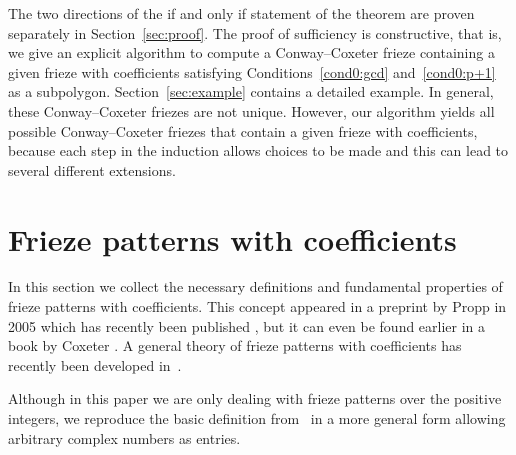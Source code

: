 \documentclass[10pt]{amsart}
\numberwithin{equation}{section}
\theoremstyle{definition}
\theoremstyle{remark}
\begin{document}
The two directions of the if and only if statement of the
theorem are proven separately in Section~\ref{sec:proof}. The proof of
sufficiency is constructive, that is, we give an explicit algorithm to
compute a Conway--Coxeter frieze containing a given frieze with coefficients
satisfying Conditions~\eqref{cond0:gcd} and~\eqref{cond0:p+1} as a subpolygon. 
Section~\ref{sec:example} contains a detailed example. 
In general, these Conway--Coxeter friezes are not unique. However, 
our algorithm yields all possible Conway--Coxeter friezes that contain a 
given frieze with coefficients, because each step in the induction 
allows choices to be made and this can lead to 
several different extensions.

\section{Frieze patterns with coefficients}
\label{sec:definition}

In this section we collect the necessary definitions and fundamental properties
of frieze patterns with coefficients. This concept appeared in a preprint by Propp in 2005 which has recently been published
\cite{Propp}, but it can even be found earlier in a book by Coxeter
\cite{Cox91}. A general theory of frieze patterns with
coefficients has recently been developed in~\cite{CHJ}. 

Although in this paper we are only dealing with frieze patterns over the positive integers, 
we reproduce the basic definition from~\cite{CHJ} in a more
general form allowing arbitrary complex numbers as entries. 
\end{document}
